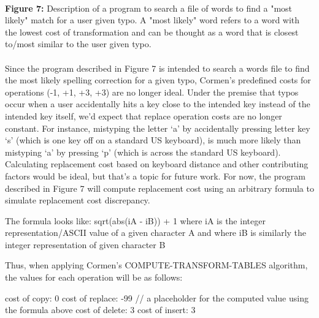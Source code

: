 \documentclass[12pt,letterpaper]{article}
\begin{document}
\paragraph{}
\begin{footnotesize}
    \textbf{Figure 7:} Description of a program to search a file of words to find a "most likely" match for a user given typo. A "most likely" word refers to a word with the lowest cost of transformation and can be thought as a word that is closest to/most similar to the user given typo.
\end{footnotesize}
\paragraph{}

Since the program described in Figure 7 is intended to search a words file to find the most likely spelling correction for a given typo, Cormen’s predefined costs for operations (-1, +1, +3, +3) are no longer ideal. Under the premise that typos occur when a user accidentally hits a key close to the intended key instead of the intended key itself, we’d expect that replace operation costs are no longer constant. For instance, mistyping the letter ‘a’ by accidentally pressing letter key ‘s’ (which is one key off on a standard US keyboard), is much more likely than mistyping ‘a’ by pressing ‘p’ (which is across the standard US keyboard). Calculating replacement cost based on keyboard distance and other contributing factors would be ideal, but that’s a topic for future work. For now, the program described in Figure 7 will compute replacement cost using an arbitrary formula to simulate replacement cost discrepancy.

\begin{small}
    \begin{spverbatim}
    The formula looks like:
    		sqrt(abs(iA - iB)) + 1
    where iA is the integer representation/ASCII value of a given
    character A and where iB is similarly the integer representation 
    of given character B
    \end{spverbatim}
\end{small}
    
Thus, when applying Cormen’s COMPUTE-TRANSFORM-TABLES algorithm, the values for each operation will be as follows:

\begin{small}
    \begin{spverbatim}
    cost of copy: 0
    cost of replace: -99 
        // a placeholder for the computed value using the formula above
    cost of delete: 3
    cost of insert: 3
    \end{spverbatim}
\end{small}
\end{document}
